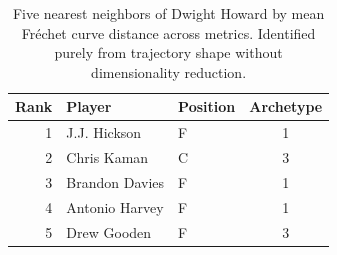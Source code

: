 \begin{table}[htbp]
  \centering\small
  \begin{tabular}{rllc}
    \toprule
    Rank & Player & Position & Archetype \\
    \midrule
    1 & J.J. Hickson & F & 1 \\
    2 & Chris Kaman & C & 3 \\
    3 & Brandon Davies & F & 1 \\
    4 & Antonio Harvey & F & 1 \\
    5 & Drew Gooden & F & 3 \\
    \bottomrule
  \end{tabular}
  \caption{Five nearest neighbors of Dwight Howard by mean Fr\'{e}chet curve distance across metrics. Identified purely from trajectory shape without dimensionality reduction.}
  \label{tab:Dwight_Howard_frechet_curve_neighbors}
\end{table}

